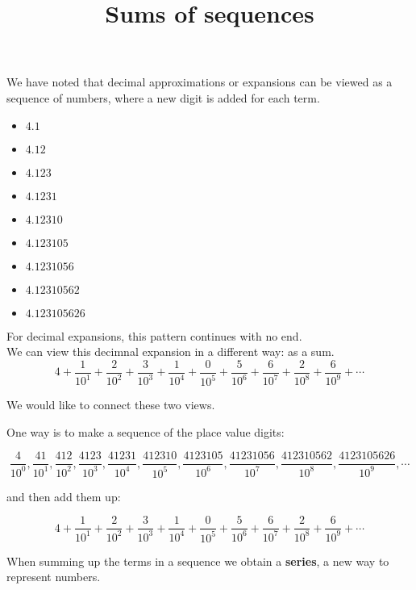 \documentclass{ximera}
\title{Sums of sequences}
\begin{document}
\begin{abstract}
\end{abstract}

\maketitle




We have noted that decimal approximations or expansions can be viewed as a sequence of numbers, where a new digit is added for each term.


\begin{itemize}
\item $4.1$
\item $4.12$
\item $4.123$
\item $4.1231$
\item $4.12310$
\item $4.123105$
\item $4.1231056$
\item $4.12310562$
\item $4.123105626$
\end{itemize}


For decimal expansions, this pattern continues with no end. \\

We can view this decimnal expansion in a different way: as a sum. \\


\[
4 + \frac{1}{10^1} + \frac{2}{10^2} + \frac{3}{10^3} + \frac{1}{10^4} + \frac{0}{10^5} + \frac{5}{10^6} + \frac{6}{10^7} + \frac{2}{10^8} + \frac{6}{10^9} + \cdots
\]



We would like to connect these two views.


One way is to make a sequence of the place value digits:  

\[
\frac{4}{10^0}, \frac{41}{10^1},  \frac{412}{10^2}, \frac{4123}{10^3}, \frac{41231}{10^4}, \frac{412310}{10^5}, \frac{4123105}{10^6}, \frac{41231056}{10^7}, \frac{412310562}{10^8}, \frac{4123105626}{10^9}, \cdots
\]


and then add them up:



\[
4 + \frac{1}{10^1} + \frac{2}{10^2} + \frac{3}{10^3} + \frac{1}{10^4} + \frac{0}{10^5} + \frac{5}{10^6} + \frac{6}{10^7} + \frac{2}{10^8} + \frac{6}{10^9} + \cdots
\]

When summing up the terms in a sequence we obtain a \textbf{series}, a new way to represent numbers. \\
\end{document}
